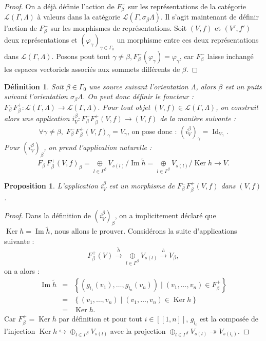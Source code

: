 \documentclass[a4paper,10pt]{article}
\newtheorem{defi}{Définition}[section]
\newtheorem{prop}{Proposition}[section]
\DeclareMathOperator{\Ker}{Ker}
\DeclareMathOperator{\Id}{Id}
\DeclareMathOperator{\Img}{Im}
\begin{document}
\begin{proof}
On a déjà définie l'action de $F_{\beta}^{-}$ sur les représentations de la catégorie $\mathscr L(\Gamma,\Lambda)$ à valeurs dans la catégorie $\mathscr L(\Gamma,\sigma_{\beta}\Lambda)$. Il s'agit maintenant de définir l'action de $F_{\beta}^{-}$ sur les morphismes de représentations. Soit $(V,f)$ et $(V',f')$ deux représentations et $(\varphi_{\gamma})_{\gamma \in \Gamma_{0}}$ un morphisme entre ces deux représentations dans $\mathscr L(\Gamma,\Lambda)$. Posons pout tout $\gamma \neq \beta, F_{\beta}^{-}(\varphi_{\gamma}) = \varphi_{\gamma}$, car $F_{\beta}^{-}$ laisse inchangé les espaces vectoriels associés aux sommets différents de $\beta$.
\end{proof}
\begin{defi}
	Soit $\beta\in\Gamma_{0}$ une source suivant l'orientation $\Lambda$, alors $\beta$ est un puits suivant l'orientation $\sigma_{\beta}\Lambda$. On peut donc définir le foncteur : $F_{\beta}^{-}F_{\beta}^{+}:\mathscr{L}(\Gamma,\Lambda)\rightarrow\mathscr{L}(\Gamma,\Lambda).$ Pour tout objet $(V,f)\in\mathscr{L}(\Gamma,\Lambda)$, on construit alors une application $i_{V}^{\beta}:F_{\beta}^{-}F_{\beta}^{+}(V,f)\rightarrow (V,f)$ de la manière suivante :
	\[
		\forall \gamma\neq\beta,\;F_{\beta}^{-}F_{\beta}^{+}(V,f)_{\gamma}=V_{\gamma}\text{, on pose donc : }(i_{V}^{\beta})_{\gamma}=\Id_{V_{\gamma}}.
	\]
	Pour $(i_{V}^{\beta})_{\beta}$, on prend l'application naturelle : 
	\[
		F_{\beta}^{-}F_{\beta}^{+}(V,f)_{\beta}=\underset{l\in\Gamma^{\beta}}{\oplus} V_{s(l)}/\Img \tilde{h}=\underset{l\in\Gamma^{\beta}}{\oplus} V_{s(l)}/\Ker h \rightarrow V.
	\]
\end{defi}
\begin{prop}
	L'application $i_{V}^{\beta}$ est un morphisme de $F_{\beta}^{-}F_{\beta}^{+}(V,f)$ dans $(V,f)$.
\end{prop}
\begin{proof}
	Dans la définition de $(i_{V}^{\beta})_{\beta}$, on a implicitement déclaré que $\Ker h=\Img\tilde h$, nous allons le prouver. Considérons la suite d'applications suivante :
	\[
		F_{\beta}^{+}(V)\overset{\tilde h}{\longrightarrow}\underset{l\in\Gamma^{\beta}}{\oplus}V_{s(l)}\overset{h}{\longrightarrow}V_{\beta},
	\]
on a alors :
\[
	\begin{array}{lll}
		\Img \tilde h &=& \left\{ (g_{l_{1}}(v_{1}),\dots,g_{l_{n}}(v_{n})) \;|\; (v_{1},\dots,v_{n})\in F_{\beta}^{+} \right\}\\
		&=& \left\{ (v_{1},\dots,v_{n})\;|\;(v_{1},\dots,v_{n})\in\Ker h \right\}\\
		&=& \Ker h.
\end{array}
\]
Car $F_{\beta}^{+}=\Ker h$ par définition et pour tout $i\in[\![1,n]\!]$, $g_{l_{i}}$ est la composée de l'injection $\Ker h \hookrightarrow \oplus_{l\in\Gamma^{\beta}}V_{s(l)}$ avec la projection $\oplus_{l\in\Gamma^{\beta}}V_{s(l)}\twoheadrightarrow V_{s(l_{i})}$.
\end{proof}
\end{document}
